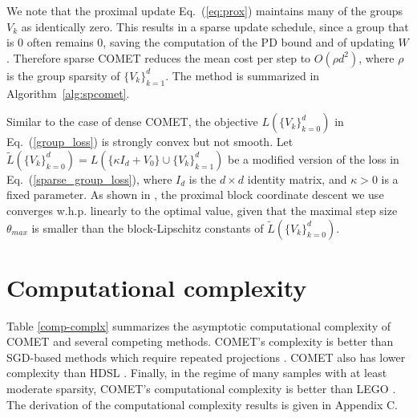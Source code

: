 \documentclass[twoside,11pt]{article}
\newcommand\mat[1]{{#1}}
\newcommand{\W}{\mat{W}}
\newcommand{\Vk}{\mat{V_k}}
\newcommand{\Vg}{\{\Vk\}_{k=0}^{d}} %
\newcommand{\Vgrc}{\{\Vk\}_{k=1}^{d}} %
\renewcommand{\eqref}[1]{Eq.~(\ref{#1})}
\begin{document}
We note that the proximal update \eqref{eq:prox} maintains many of the groups $V_k$ as identically zero. This results in a sparse update schedule, since a group that is $0$ often remains $0$, saving the computation of the PD bound and of updating $\W$. Therefore sparse COMET reduces the mean cost per step to $O(\rho d^2)$, where $\rho$ is the group sparsity of $\Vgrc$. The method is summarized in Algorithm~\ref{alg:spcomet}.

Similar to the case of dense COMET, the objective $L(\Vg)$ in \eqref{group_loss} is strongly convex but not smooth. Let $\tilde{L}(\Vg) = L(\{\kappa I_d + V_0\} \cup \{V_k\}_{k=1}^d)$ be a modified version of the loss in \eqref{sparse_group_loss}, where $I_d$ is the $d \times d$ identity matrix, and $\kappa>0$ is a fixed parameter.
As shown in \cite[Theorem 7]{richtarik2014iteration}, the proximal block coordinate descent we use converges w.h.p. linearly to the optimal value, given that the maximal step size $\theta_{max}$ is smaller than the block-Lipschitz constants of $\tilde{L}(\Vg)$.


\section{Computational complexity}

Table \ref{comp-complx} summarizes the asymptotic computational complexity of COMET and several competing methods. COMET's complexity is better than SGD-based methods which require repeated projections \citep{OASIS, qian}. COMET also has lower complexity than HDSL \citep{HDSL}.  Finally, in the regime of many samples with at least moderate sparsity, COMET's computational complexity is better than LEGO \citep{lego}. The derivation of the computational complexity results is given in Appendix C.
\end{document}

